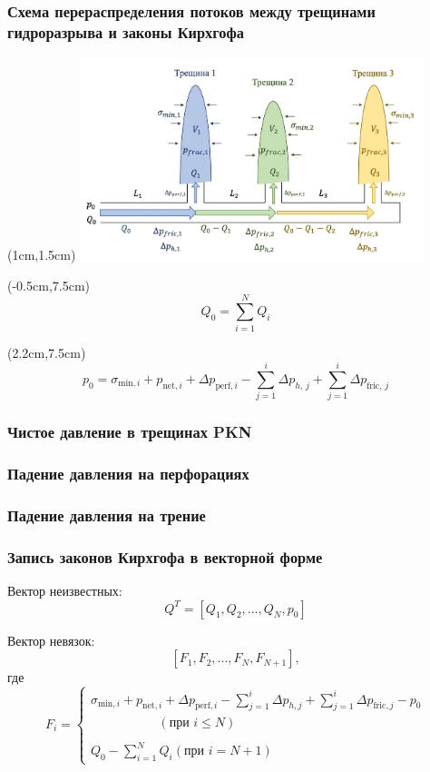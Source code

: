 \documentclass{beamer}
\begin{document}
\begin{frame}
\frametitle{Схема перераспределения потоков между трещинами гидроразрыва и законы Кирхгофа}

\begin{textblock*}{11cm}(1cm,1.5cm)
\includegraphics[width=10cm]{flow_distribution_scheme.jpg}
\end{textblock*}

\begin{textblock*}{4cm}(-0.5cm,7.5cm)
$$\boxed{Q_0=\sum\limits_{i=1}^{N}Q_i}$$
\end{textblock*}

\begin{textblock*}{11cm}(2.2cm,7.5cm)
$$\boxed{p_0=\sigma_{\text{min},i}+p_{\text{net},i}+\Delta p_{\text{perf},i}-\sum_{j=1}^{i}{\Delta p_{h,\,j}}+\sum_{j=1}^{i}\Delta p_{\text{fric},\,j}}$$
\end{textblock*}

\end{frame}


\begin{frame}
\frametitle{Чистое давление в трещинах PKN}

\end{frame}


\begin{frame}
\frametitle{Падение давления на перфорациях}

\end{frame}


\begin{frame}
\frametitle{Падение давления на трение}

\end{frame}


\begin{frame}
\frametitle{Запись законов Кирхгофа в векторной форме}

Вектор неизвестных:
$$Q^T=\left[Q_1,Q_2,...,Q_N,p_0\right]$$

Вектор невязок:
$$\left[F_1,F_2,...,F_N,F_{N+1}\right],$$
где
$$
F_i=
\begin{cases}
\sigma_{\text{min},i}+p_{\text{net},i}+\Delta p_{\text{perf},i}-\sum\limits_{j=1}^{i}{\Delta p_{h,j}}+\sum\limits_{j=1}^{i}{\Delta p_{\text{fric},j}}-p_0\\\,\,\,\,\,\,\,\,\,\,\,\,\,\,\,\,\,\,\,\,\,\,\,\,\,\,\,\,\,\,\,\,\left(\text{при }i\leqslant N\right)\\\ \\
Q_0-\sum\limits_{i=1}^{N}{Q_i}\left(\text{при }i=N+1\right)
\end{cases}
$$

\end{frame}
\end{document}
